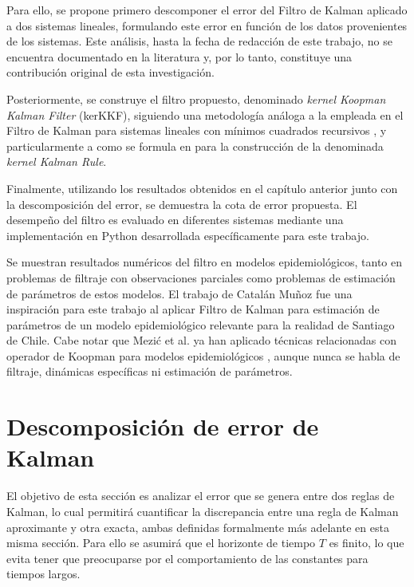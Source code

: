 Para ello, se propone primero descomponer el error del Filtro de Kalman aplicado a dos sistemas lineales, formulando este error en función de los datos provenientes de los sistemas. Este análisis, hasta la fecha de redacción de este trabajo, no se encuentra documentado en la literatura y, por lo tanto, constituye una contribución original de esta investigación.

Posteriormente, se construye el filtro propuesto, denominado \textit{kernel Koopman Kalman Filter} (kerKKF), siguiendo una metodología análoga a la empleada en el Filtro de Kalman para sistemas lineales con mínimos cuadrados recursivos \cite{Kalman1960AProblems, Triantafyllopoulos2021BayesianBeyond}, y particularmente a como se formula en \cite{Gebhard2019} para la construcción de la denominada \textit{kernel Kalman Rule}.

Finalmente, utilizando los resultados obtenidos en el capítulo anterior junto con la descomposición del error, se demuestra la cota de error propuesta. El desempeño del filtro es evaluado en diferentes sistemas mediante una implementación en Python desarrollada específicamente para este trabajo.

Se muestran resultados numéricos del filtro en modelos epidemiológicos, tanto en problemas de filtraje con observaciones parciales como problemas de estimación de parámetros de estos modelos. El trabajo de Catalán Muñoz \cite{CatalanMunoz2022DesarrolloChile} fue una inspiración para este trabajo al aplicar Filtro de Kalman para estimación de parámetros de un modelo epidemiológico relevante para la realidad de Santiago de Chile. Cabe notar que Mezić et al. ya han aplicado técnicas relacionadas con operador de Koopman para modelos epidemiológicos \cite{Mezic2024ACases}, aunque nunca se habla de filtraje, dinámicas específicas ni estimación de parámetros. 

\section{Descomposición de error de Kalman}

El objetivo de esta sección es analizar el error que se genera entre dos reglas de Kalman, lo cual permitirá cuantificar la discrepancia entre una regla de Kalman aproximante y otra exacta, ambas definidas formalmente más adelante en esta misma sección. Para ello se asumirá que el horizonte de tiempo $T$ es finito, lo que evita tener que preocuparse por el comportamiento de las constantes para tiempos largos.

